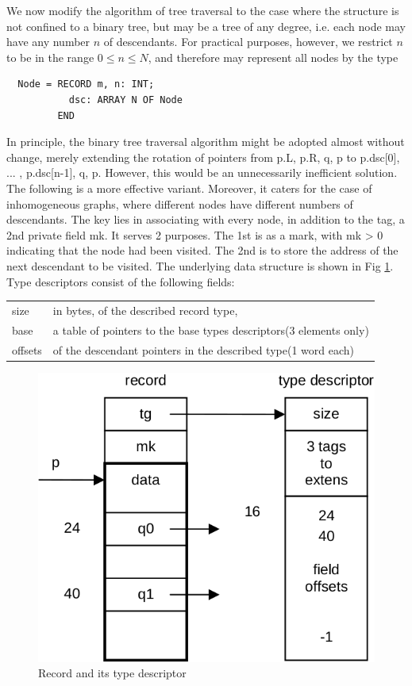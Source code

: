 We now modify the algorithm of tree traversal to the case where the structure is not confined
to a binary tree, but may be a tree of any degree, i.e. each node may have any number $n$ of
descendants. For practical purposes, however, we restrict $n$ to be in the range $0 \leq n
\leq N$, and therefore may represent all nodes by the type
\begin{verbatim}
  Node = RECORD m, n: INT;
           dsc: ARRAY N OF Node
         END
\end{verbatim}
In principle, the binary tree traversal algorithm might be adopted almost without change,
merely extending the rotation of pointers from p.L, p.R, q, p to p.dsc[0], ... , p.dsc[n-1], q, p. However, this
would be an unnecessarily inefficient solution. The following is a more effective variant. Moreover, it
caters for the case of inhomogeneous graphs, where different nodes have different numbers of
descendants. The key lies in associating with every node, in addition to the tag, a 2nd private
field mk. It serves 2 purposes. The 1st is as a mark, with mk > 0 indicating that the node had
been visited. The 2nd is to store the address of the next descendant to be visited. The
underlying data structure is shown in Fig \ref{fig:record}. Type descriptors consist of the following fields:
\begin{table}[h!]
  \centering
  \setlength{\tabcolsep}{2pt}
  \begin{tabular}{l l}
    size & {\small in bytes, of the described record type,} \\
    base & {\small a table of pointers to the base types descriptors(3 elements only)} \\
    {\small offsets} & {\small of the descendant pointers in the described type(1 word each)}
  \end{tabular}
\end{table}
\begin{figure}[h!]
  \centering
  \includegraphics[width=.9\textwidth]{i/x}
  \caption{Record and its type descriptor}
  \label{fig:record}
\end{figure}

